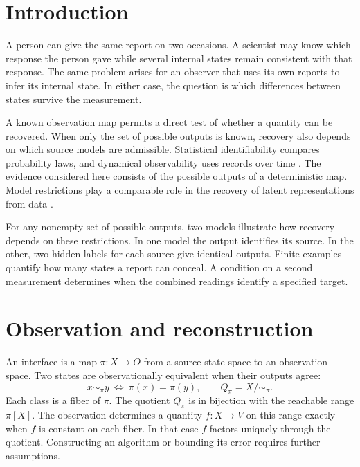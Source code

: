 \section{Introduction}
\label{sec:mainintro}
A person can give the same report on two occasions. A scientist may know which response the person gave while several internal states remain consistent with that response. The same problem arises for an observer that uses its own reports to infer its internal state. In either case, the question is which differences between states survive the measurement.

A known observation map permits a direct test of whether a quantity can be recovered. When only the set of possible outputs is known, recovery also depends on which source models are admissible. Statistical identifiability compares probability laws, and dynamical observability uses records over time \parencite{Rothenberg1971,HermannKrener1977}. The evidence considered here consists of the possible outputs of a deterministic map. Model restrictions play a comparable role in the recovery of latent representations from data \parencite{Locatello2019}.

For any nonempty set of possible outputs, two models illustrate how recovery depends on these restrictions. In one model the output identifies its source. In the other, two hidden labels for each source give identical outputs. Finite examples quantify how many states a report can conceal. A condition on a second measurement determines when the combined readings identify a specified target.

\section{Observation and reconstruction}
\label{sec:mainframework}
An interface is a map \(\pi:X\to O\) from a source state space to an observation space. Two states are observationally equivalent when their outputs agree:
\begin{equation}
x\sim_\pi y\ \Longleftrightarrow\ \pi(x)=\pi(y),
\qquad Q_\pi=X/{\sim_\pi}.
\label{eq:stateequivalence}
\end{equation}
Each class is a fiber of \(\pi\). The quotient \(Q_\pi\) is in bijection with the reachable range \(\pi[X]\). The observation determines a quantity \(f:X\to V\) on this range exactly when \(f\) is constant on each fiber. In that case \(f\) factors uniquely through the quotient. Constructing an algorithm or bounding its error requires further assumptions.

